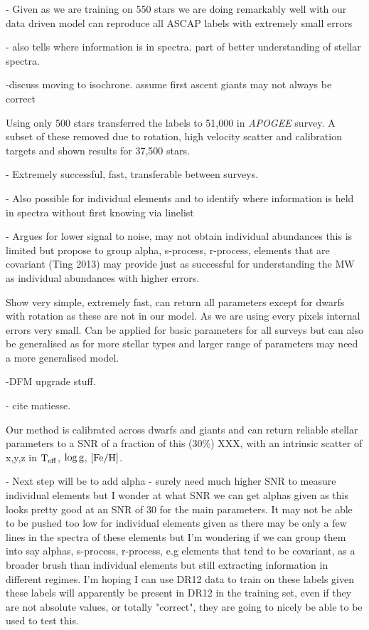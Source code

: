 \documentclass[12pt, preprint]{aastex}
\newcommand{\teff}{\mbox{$\rm T_{eff}$}}
\newcommand{\feh}{\mbox{$\rm [Fe/H]$}}
\newcommand{\logg}{\mbox{$\rm \log g$}}
\begin{document}
- Given as we are training on 550 stars we are doing remarkably well with our data driven model can reproduce all ASCAP labels with extremely small errors

- also tells where information is in spectra. part of better understanding of stellar spectra. 

-discuss moving to isochrone. assume first ascent giants may not always be correct

Using only 500 stars transferred the labels to 51,000 in \textit{APOGEE} survey. A subset of these removed due to rotation, high velocity scatter and calibration targets and shown results for 37,500 stars. 

- Extremely successful, fast, transferable between surveys. 

- Also possible for individual elements and to identify where information is held in spectra without first knowing via linelist

- Argues for lower signal to noise, may not obtain individual abundances this is limited but propose to group alpha, s-process, r-process, elements that are covariant (Ting 2013) may provide just as successful for understanding the MW as individual abundances with higher errors. 



Show very simple, extremely fast, can return all parameters except for dwarfs with rotation as these are not in our model. As we are using every pixels internal errors very small. Can be applied for basic parameters for all surveys but can also be generalised as for more stellar types and larger range of parameters may need a more generalised model. 

-DFM upgrade stuff. 

- cite matiesse. 

Our method is calibrated across dwarfs and giants and can return reliable stellar parameters to a SNR of a fraction of this (30\%) XXX, with an intrinsic scatter of x,y,z in \teff, \logg, \feh.

- Next step will be to add alpha - surely need much higher SNR to measure individual elements but 
I wonder at what SNR we can get alphas given as this looks pretty good at an SNR of 30 for the main parameters. It may not be able to be pushed too low for individual elements given as there may be only a few lines in the spectra of these elements but I'm wondering if we can group them into say alphas, s-process, r-process, e.g elements that tend to be covariant, as a broader brush than individual elements but still extracting information in different regimes. I'm hoping I can use DR12 data to train on these labels given these labels will apparently be present in DR12 in the training set, even if they are not absolute values, or totally "correct", they are going to nicely be able to be used to test this. 
\end{document}
